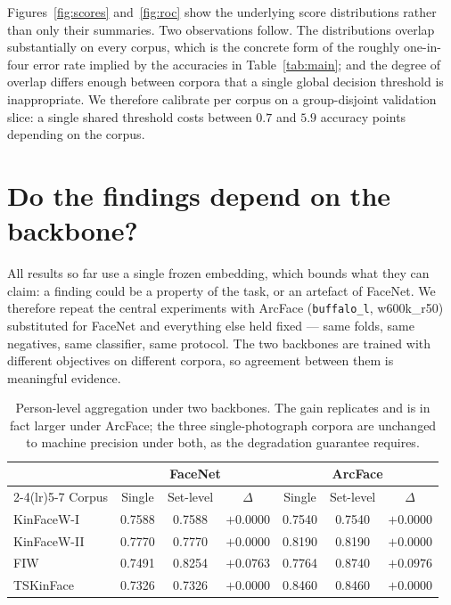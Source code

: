 \documentclass[preprint,12pt]{elsarticle}
\begin{document}
Figures~\ref{fig:scores} and~\ref{fig:roc} show the underlying score
distributions rather than only their summaries. Two observations follow. The
distributions overlap substantially on every corpus, which is the concrete form
of the roughly one-in-four error rate implied by the accuracies in
Table~\ref{tab:main}; and the degree of overlap differs enough between corpora
that a single global decision threshold is inappropriate. We therefore
calibrate per corpus on a group-disjoint validation slice: a single shared
threshold costs between $0.7$ and $5.9$ accuracy points depending on the
corpus.

\section{Do the findings depend on the backbone?}
\label{sec:backbone}

All results so far use a single frozen embedding, which bounds what they can
claim: a finding could be a property of the task, or an artefact of FaceNet. We
therefore repeat the central experiments with ArcFace (\texttt{buffalo\_l},
w600k\_r50) substituted for FaceNet and everything else held fixed --- same
folds, same negatives, same classifier, same protocol. The two backbones are
trained with different objectives on different corpora, so agreement between
them is meaningful evidence.

\begin{table}[t]
\centering
\caption{Person-level aggregation under two backbones. The gain replicates and
is in fact larger under ArcFace; the three single-photograph corpora are
unchanged to machine precision under both, as the degradation guarantee
requires.}
\label{tab:backbone}
\begin{tabular}{lcccccc}
\toprule
& \multicolumn{3}{c}{FaceNet} & \multicolumn{3}{c}{ArcFace} \\
\cmidrule(lr){2-4}\cmidrule(lr){5-7}
Corpus & Single & Set-level & $\Delta$ & Single & Set-level & $\Delta$ \\
\midrule
KinFaceW-I & 0.7588 & 0.7588 & $+0.0000$ & 0.7540 & 0.7540 & $+0.0000$ \\
KinFaceW-II & 0.7770 & 0.7770 & $+0.0000$ & 0.8190 & 0.8190 & $+0.0000$ \\
FIW & 0.7491 & 0.8254 & $+0.0763$ & 0.7764 & 0.8740 & $+0.0976$ \\
TSKinFace & 0.7326 & 0.7326 & $+0.0000$ & 0.8460 & 0.8460 & $+0.0000$ \\
\bottomrule
\end{tabular}
\end{table}
\end{document}
